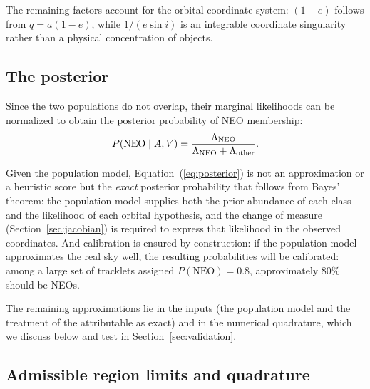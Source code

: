 \documentclass[linenumbers,twocolumn]{aastex701}
\begin{document}
The remaining factors account for the orbital
coordinate system: $(1-e)$ follows from $q=a(1-e)$, while
$1/(e\sin i)$ is an integrable coordinate singularity rather than a physical
concentration of objects.

\subsection{The posterior}
\label{sec:posterior}

Since the two populations do not overlap, their marginal
likelihoods can be normalized to obtain the posterior probability of NEO
membership:
\begin{equation}
P(\mathrm{NEO}\mid A,V)
= \frac{\Lambda_{\rm NEO}}
{\Lambda_{\rm NEO}+\Lambda_{\rm other}}.
\label{eq:posterior}
\end{equation}

Given the population model, Equation~(\ref{eq:posterior}) is not an
approximation or a heuristic score but the {\em exact} posterior probability that follows
from Bayes' theorem: the population model supplies both the prior abundance
of each class and the likelihood of each orbital hypothesis, and the change
of measure (Section~\ref{sec:jacobian}) is required to express that
likelihood in the observed coordinates. And calibration is ensured by construction: if the population model
approximates the real sky well, the resulting probabilities will be calibrated: among a
large set of tracklets assigned $P(\mathrm{NEO})=0.8$, approximately 80\%
should be NEOs.

The remaining approximations lie in
the inputs (the population model and the treatment of the attributable as
exact) and in the numerical quadrature, which we discuss below and test in
Section~\ref{sec:validation}.


\subsection{Admissible region limits and quadrature}
\label{sec:ar}
\end{document}
